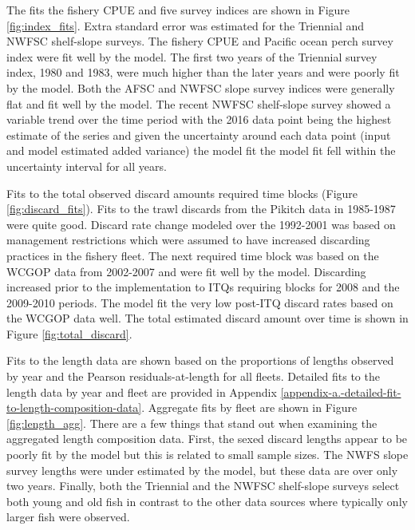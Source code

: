 \documentclass[12pt,]{article}
\begin{document}
The fits the fishery CPUE and five survey indices are shown in Figure
\ref{fig:index_fits}. Extra standard error was estimated for the
Triennial and NWFSC shelf-slope surveys. The fishery CPUE and Pacific
ocean perch survey index were fit well by the model. The first two years
of the Triennial survey index, 1980 and 1983, were much higher than the
later years and were poorly fit by the model. Both the AFSC and NWFSC
slope survey indices were generally flat and fit well by the model. The
recent NWFSC shelf-slope survey showed a variable trend over the time
period with the 2016 data point being the highest estimate of the series
and given the uncertainty around each data point (input and model
estimated added variance) the model fit the model fit fell within the
uncertainty interval for all years.

Fits to the total observed discard amounts required time blocks (Figure
\ref{fig:discard_fits}). Fits to the trawl discards from the Pikitch
data in 1985-1987 were quite good. Discard rate change modeled over the
1992-2001 was based on management restrictions which were assumed to
have increased discarding practices in the fishery fleet. The next
required time block was based on the WCGOP data from 2002-2007 and were
fit well by the model. Discarding increased prior to the implementation
to ITQs requiring blocks for 2008 and the 2009-2010 periods. The model
fit the very low post-ITQ discard rates based on the WCGOP data well.
The total estimated discard amount over time is shown in Figure
\ref{fig:total_discard}.

Fits to the length data are shown based on the proportions of lengths
observed by year and the Pearson residuals-at-length for all fleets.
Detailed fits to the length data by year and fleet are provided in
Appendix \ref{appendix-a.-detailed-fit-to-length-composition-data}.
Aggregate fits by fleet are shown in Figure \ref{fig:length_agg}. There
are a few things that stand out when examining the aggregated length
composition data. First, the sexed discard lengths appear to be poorly
fit by the model but this is related to small sample sizes. The NWFS
slope survey lengths were under estimated by the model, but these data
are over only two years. Finally, both the Triennial and the NWFSC
shelf-slope surveys select both young and old fish in contrast to the
other data sources where typically only larger fish were observed.
\end{document}
